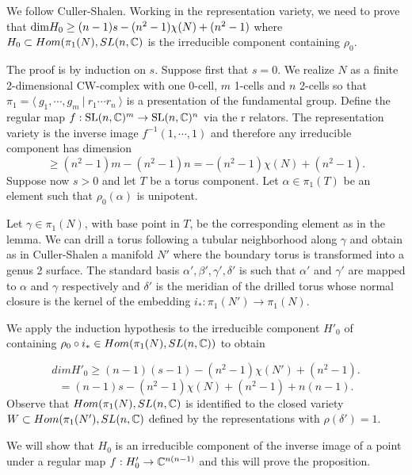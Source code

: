 \begin{pf}
We follow Culler-Shalen.  Working in the representation variety, we need to prove that ${\rm dim} H_0 \geq (n-1)s - (n^2-1)\chi (N)+(n^2-1)$
where $H_0\subset Hom(\pi_1(N),SL(n,\mathbb{C})$ is the irreducible component containing $\rho_0$. 

The proof is by induction on $s$.  Suppose first that $s=0$.  We realize $N$ as a finite 2-dimensional CW-complex with one 0-cell, $m$ 1-cells and 
$n$ 2-cells so that $\pi_1 =\langle \ g_1, \cdots , g_m \ \vert\ r_1\cdots r_n\ \rangle$ is a presentation of the fundamental group. Define the regular map $f:\textrm{SL}(n,\mathbb{C})^m\rightarrow \textrm{SL}(n,\mathbb{C})^n$ via the r relators.  The representation variety is the inverse image $f^{-1}(1,\cdots ,1)$ and therefore
any irreducible component has dimension  
$$
\geq  (n^2-1)m-(n^2-1)n=- (n^2-1)\chi (N)+(n^2-1).
$$
 Suppose now $s> 0$ and let $T$ be a torus component.  Let $\alpha\in \pi_1(T)$ be an element  such that  $\rho_0(\alpha)$ is unipotent.

 
 Let $\gamma\in \pi_1(N)$, with base point in $T$, be the corresponding element as in the lemma.   We can drill a torus following a tubular neighborhood along $\gamma$ and obtain as in Culler-Shalen a manifold $N'$ where the boundary torus is transformed into a genus 2 surface.
 The standard basis $\alpha',\beta',\gamma',\delta'$ is such that $\alpha'$ and $\gamma'$ are mapped to $\alpha$ and $\gamma$
 respectively and $\delta'$ is the meridian of the drilled torus whose normal closure is the kernel of the embedding $i_* :\pi_1(N')\rightarrow  \pi_1(N)$.
 
 We apply the induction hypothesis to the irreducible component $H'_0$ of containing $\rho_0\circ i_*\in  Hom(\pi_1(N),SL(n,\mathbb{C}))$ to obtain
 
 $$
dim H'_0 \geq (n-1)(s-1) - (n^2-1)\chi (N')+ (n^2-1).
$$
$$
= (n-1)s - (n^2-1)\chi (N)+ (n^2-1)+n(n-1).
$$
Observe that $Hom(\pi_1(N),SL(n,\mathbb{C})$ is identified to the closed variety  $W\subset Hom(\pi_1(N'),SL(n,\mathbb{C})$ defined by the representations
with $\rho(\delta')=1$.

We will show that $H_0$ is an irreducible component of the inverse image of a point under a regular map $f: H'_0\rightarrow \mathbb{C}^{n(n-1)}$ and this will prove the proposition.  
\end{pf}
